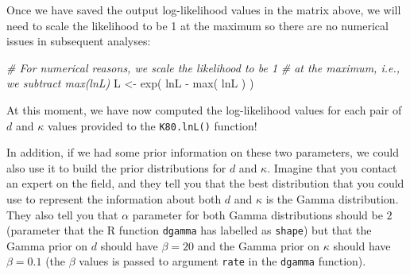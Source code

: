 \documentclass[
]{article}
\newenvironment{Shaded}{\begin{snugshade}}{\end{snugshade}}
\newcommand{\AttributeTok}[1]{\textcolor[rgb]{0.77,0.63,0.00}{#1}}
\newcommand{\CommentTok}[1]{\textcolor[rgb]{0.56,0.35,0.01}{\textit{#1}}}
\newcommand{\DecValTok}[1]{\textcolor[rgb]{0.00,0.00,0.81}{#1}}
\newcommand{\FunctionTok}[1]{\textcolor[rgb]{0.00,0.00,0.00}{#1}}
\newcommand{\NormalTok}[1]{#1}
\newcommand{\OtherTok}[1]{\textcolor[rgb]{0.56,0.35,0.01}{#1}}
\newcommand{\SpecialCharTok}[1]{\textcolor[rgb]{0.00,0.00,0.00}{#1}}
\begin{document}
Once we have saved the output log-likelihood values in the matrix above,
we will need to scale the likelihood to be 1 at the maximum so there are
no numerical issues in subsequent analyses:

\begin{Shaded}
\begin{Highlighting}[]
\CommentTok{\# For numerical reasons, we scale the likelihood to be 1}
\CommentTok{\# at the maximum, i.e., we subtract max(lnL)}
\NormalTok{L }\OtherTok{\textless{}{-}} \FunctionTok{exp}\NormalTok{( lnL }\SpecialCharTok{{-}} \FunctionTok{max}\NormalTok{( lnL ) )}
\end{Highlighting}
\end{Shaded}

At this moment, we have now computed the log-likelihood values for each
pair of \(d\) and \(\kappa\) values provided to the \texttt{K80.lnL()}
function!

In addition, if we had some prior information on these two parameters,
we could also use it to build the prior distributions for \(d\) and
\(\kappa\). Imagine that you contact an expert on the field, and they
tell you that the best distribution that you could use to represent the
information about both \(d\) and \(\kappa\) is the Gamma distribution.
They also tell you that \(\alpha\) parameter for both Gamma
distributions should be \(2\) (parameter that the R function
\texttt{dgamma} has labelled as \texttt{shape}) but that the Gamma prior
on \(d\) should have \(\beta=20\) and the Gamma prior on \(\kappa\)
should have \(\beta=0.1\) (the \(\beta\) values is passed to argument
\texttt{rate} in the \texttt{dgamma} function).

\begin{Shaded}
\end{Shaded}
\end{document}
